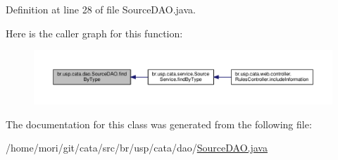 Definition at line 28 of file Source\+D\+A\+O.\+java.



Here is the caller graph for this function\+:\nopagebreak
\begin{figure}[H]
\begin{center}
\leavevmode
\includegraphics[width=350pt]{classbr_1_1usp_1_1cata_1_1dao_1_1_source_d_a_o_af443cde9c2906b4d97916f5b46d39c86_icgraph}
\end{center}
\end{figure}




The documentation for this class was generated from the following file\+:\begin{DoxyCompactItemize}
\item 
/home/mori/git/cata/src/br/usp/cata/dao/\hyperlink{_source_d_a_o_8java}{Source\+D\+A\+O.\+java}\end{DoxyCompactItemize}
